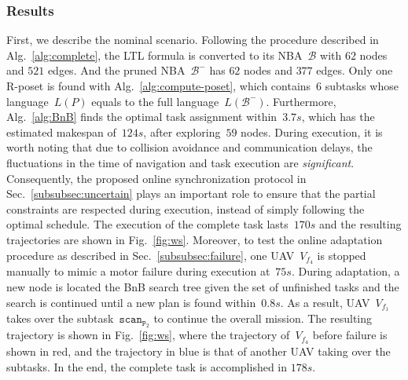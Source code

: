 \subsubsection{Results}\label{subsubsec:hw-results}
First, we describe the nominal scenario.
Following the procedure described in Alg.~\ref{alg:complete},
the LTL formula is converted to its NBA~$\mathcal{B}$ with $62$ nodes and $521$ edges.
And the pruned NBA~$\mathcal{B}^-$ has $62$ nodes and $377$ edges.
Only one R-poset is found with Alg.~\ref{alg:compute-poset},
which contains~$6$ subtasks whose language~$L(P)$ equals to the full language~$L(\mathcal{B}^-)$.
Furthermore, Alg.~\ref{alg:BnB} finds the
optimal task assignment within~$3.7s$,
which has the estimated makespan of~$124s$, after exploring~$59$ nodes.
During execution, it is worth noting that due to collision avoidance and communication delays,
the fluctuations in the time of navigation and task execution are \emph{significant}.
Consequently, the proposed online synchronization protocol in Sec.~\ref{subsubsec:uncertain}
plays an important role to ensure that the partial constraints
are respected during execution,
instead of simply following the optimal schedule.
The execution of the complete task lasts~$170s$ and
the resulting trajectories are shown in Fig.~\ref{fig:ws}.
Moreover, to test the online adaptation procedure
as described in Sec.~\ref{subsubsec:failure},
one UAV~$V_{f_4}$ is stopped manually to mimic a motor failure during execution at~$75s$.
During adaptation, a new node is located the BnB search tree
given the set of unfinished tasks
and the search is continued until a new plan is found within~$0.8s$.
As a result, UAV~$V_{f_1}$ takes over the subtask~$\texttt{scan}_{\texttt{P}_2}$
to continue the overall mission.
The resulting trajectory is shown in Fig.~\ref{fig:ws},
where the trajectory of~$V_{f_4}$ before failure is shown in red,
and the trajectory in blue is that of another UAV taking over the subtasks.
In the end, the complete task is accomplished in $178s$.

